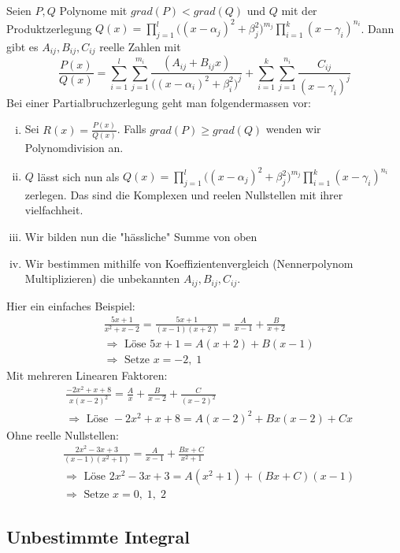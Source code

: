 \documentclass[8pt]{extarticle}
\begin{document}
\begin{multicols*}{3}
Seien $P, Q$ Polynome mit $grad(P) < grad(Q)$ und $Q$ mit der Produktzerlegung $Q(x) = \prod_{j = 1}^l \big( (x- \alpha_j)^2 + \beta_j^2\big)^{m_j} \prod_{i = 1}^k (x - \gamma_i)^{n_i}$. Dann gibt es $A_{ij}, B_{ij}, C_{ij}$ reelle Zahlen mit
$$
  \frac{P(x)}{Q(x)} = \sum_{i = 1}^l \sum_{j = 1}^{m_i} \frac{(A_{ij} + B_{ij}x)}{\big( (x- \alpha_i)^2 + \beta_i^2\big)^j} + \sum_{i = 1}^k \sum_{j = 1}^{n_i} \frac{C_{ij}}{(x-\gamma_i)^j}
$$
Bei einer Partialbruchzerlegung geht man folgendermassen vor:
\begin{enumerate}[(i)]
  \item Sei $R(x) = \frac{P(x)}{Q(x)}$. Falls $grad(P) \geq grad(Q)$ wenden wir Polynomdivision an.
  \item $Q$ lässt sich nun als $Q(x) = \prod_{j = 1}^l \big( (x- \alpha_j)^2 + \beta_j^2\big)^{m_j} \prod_{i = 1}^k (x - \gamma_i)^{n_i}$ zerlegen. Das sind
  die Komplexen und reelen Nullstellen mit ihrer vielfachheit.
  \item Wir bilden nun die "hässliche" Summe von oben
  \item Wir bestimmen mithilfe von Koeffizientenvergleich (Nennerpolynom Multiplizieren) die unbekannten $A_{ij}, B_{ij}, C_{ij}$.
\end{enumerate}
Hier ein einfaches Beispiel:
\begin{align*}
  &\frac{5x + 1}{x^2 + x - 2} = \frac{5x + 1}{(x - 1)(x + 2)} = \frac{A}{x - 1} + \frac{B}{x + 2} \\
  &\Rightarrow \text{ Löse } 5x + 1 = A(x + 2) + B(x - 1) \\
  &\Rightarrow \text{ Setze } x = -2,\;1
\end{align*}
Mit mehreren Linearen Faktoren:
\begin{align*}
  &\frac{-2x^2 + x + 8}{x (x-2)^2} = \frac{A}{x} + \frac{B}{x - 2} + \frac{C}{(x-2)^2} \\
  &\Rightarrow \text{ Löse } -2x^2 + x + 8 = A(x - 2)^2 + Bx(x - 2) + Cx
\end{align*}
Ohne reelle Nullstellen:
\begin{align*}
  &\frac{2x^2 -3x + 3}{(x-1)(x^2 + 1)} = \frac{A}{x - 1} + \frac{Bx + C}{x^2 + 1} \\
  &\Rightarrow \text{ Löse } 2x^2 -3x + 3 = A(x^2 + 1) + (Bx + C)(x - 1) \\
  &\Rightarrow \text{ Setze } x = 0,\;1,\;2
\end{align*}

\subsection{Unbestimmte Integral}


\end{multicols*}
\end{document}
